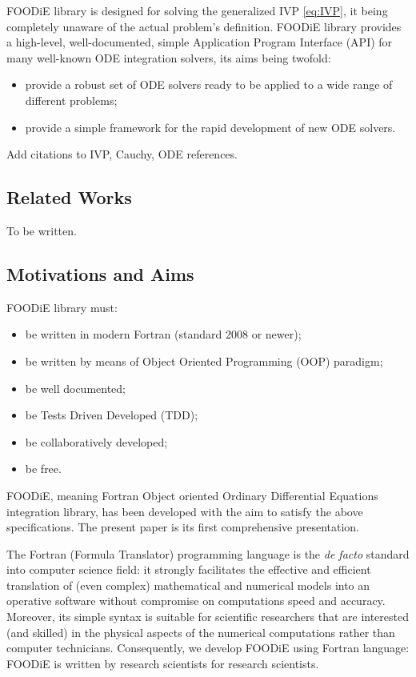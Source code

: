 \documentclass[pdftex,preprint,3p,times,numbers]{elsarticle}
\begin{document}
FOODiE library is designed for solving the generalized IVP \ref{eq:IVP}, it being completely unaware of the actual problem's definition. FOODiE library provides a high-level, well-documented, simple Application Program Interface (API) for many well-known ODE integration solvers, its aims being twofold:

\begin{itemize}
  \item provide a robust set of ODE solvers ready to be applied to a wide range of different problems;
  \item provide a simple framework for the rapid development of new ODE solvers.
\end{itemize}

{\color{red} Add citations to IVP, Cauchy, ODE references.}

\subsection{Related Works}

{\color{red} To be written.}

\subsection{Motivations and Aims}

FOODiE library must:

\begin{itemize}
  \item be written in modern Fortran (standard 2008 or newer);
  \item be written by means of Object Oriented Programming (OOP) paradigm;
  \item be well documented;
  \item be Tests Driven Developed (TDD);
  \item be collaboratively developed;
  \item be free.
\end{itemize}

FOODiE, meaning Fortran Object oriented Ordinary Differential Equations integration library, has been developed with the aim to satisfy the above specifications. The present paper is its first comprehensive presentation.

The Fortran (Formula Translator) programming language is the \emph{de facto} standard into computer science field: it strongly facilitates the effective and efficient translation of (even complex) mathematical and numerical models into an operative software without compromise on computations speed and accuracy. Moreover, its simple syntax is suitable for scientific researchers that are interested (and skilled) in the physical aspects of the numerical computations rather than computer technicians. Consequently, we develop FOODiE using Fortran language: FOODiE is written by research scientists for research scientists.
\end{document}
